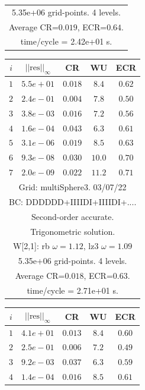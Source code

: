 \begin{table}[hbt]
\begin{center}
{\begin{tabular}{|c|c|c|c|c|}
\multicolumn{5}{|c|}{5.35e+06 grid-points. 4 levels.}  \\
\multicolumn{5}{|c|}{Average CR=$0.019$, ECR=$0.64$.}  \\
\multicolumn{5}{|c|}{time/cycle = 2.42e+01 s.}  \\
\hline 
\end{tabular}
\begin{tabular}{|c|c|c|c|c|} \hline 
 $i$   & $\vert\vert\mbox{res}\vert\vert_\infty$  &  CR     &  WU    & ECR  \\   \hline 
 $ 1$  & $ 5.5e+01$ & $0.018$ & $ 8.4$ & $0.62$ \\ 
 $ 2$  & $ 2.4e-01$ & $0.004$ & $ 7.8$ & $0.50$ \\ 
 $ 3$  & $ 3.8e-03$ & $0.016$ & $ 7.2$ & $0.56$ \\ 
 $ 4$  & $ 1.6e-04$ & $0.043$ & $ 6.3$ & $0.61$ \\ 
 $ 5$  & $ 3.1e-06$ & $0.019$ & $ 8.5$ & $0.63$ \\ 
 $ 6$  & $ 9.3e-08$ & $0.030$ & $10.0$ & $0.70$ \\ 
 $ 7$  & $ 2.0e-09$ & $0.022$ & $11.2$ & $0.71$ \\ 
\hline 
\multicolumn{5}{|c|}{Grid: multiSphere3. 03/07/22}  \\
\multicolumn{5}{|c|}{BC: DDDDDD+IIIIDI+IIIIDI+....}  \\
\multicolumn{5}{|c|}{Second-order accurate.}  \\
\multicolumn{5}{|c|}{Trigonometric solution.}  \\
\multicolumn{5}{|c|}{W[2,1]: rb $\omega=1.12$, lz3 $\omega=1.09$}  \\
\multicolumn{5}{|c|}{5.35e+06 grid-points. 4 levels.}  \\
\multicolumn{5}{|c|}{Average CR=$0.018$, ECR=$0.63$.}  \\
\multicolumn{5}{|c|}{time/cycle = 2.71e+01 s.}  \\
\hline 
\end{tabular}
\begin{tabular}{|c|c|c|c|c|} \hline 
 $i$   & $\vert\vert\mbox{res}\vert\vert_\infty$  &  CR     &  WU    & ECR  \\   \hline 
 $ 1$  & $ 4.1e+01$ & $0.013$ & $ 8.4$ & $0.60$ \\ 
 $ 2$  & $ 2.5e-01$ & $0.006$ & $ 7.2$ & $0.49$ \\ 
 $ 3$  & $ 9.2e-03$ & $0.037$ & $ 6.3$ & $0.59$ \\ 
 $ 4$  & $ 1.4e-04$ & $0.016$ & $ 8.5$ & $0.61$ \\ 

\end{tabular}}
\end{center}
\end{table}
